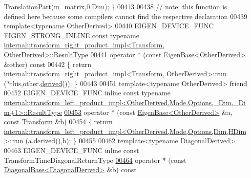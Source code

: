 \begin{DoxyCode}
      \hyperlink{group___core___module_class_eigen_1_1_block}{TranslationPart}(m\_matrix,0,Dim); \}
00413 
00438   \textcolor{comment}{// note: this function is defined here because some compilers cannot find the respective declaration}
00439   \textcolor{keyword}{template}<\textcolor{keyword}{typename} OtherDerived>
00440   EIGEN\_DEVICE\_FUNC EIGEN\_STRONG\_INLINE \textcolor{keyword}{const} \textcolor{keyword}{typename} 
      \hyperlink{struct_eigen_1_1internal_1_1transform__right__product__impl}{internal::transform\_right\_product\_impl<Transform, OtherDerived>::ResultType}
\hyperlink{group___geometry___module_a4e44db730819ead6e555cf325cea3fd6}{00441}   operator * (\textcolor{keyword}{const} \hyperlink{group___core___module_struct_eigen_1_1_eigen_base}{EigenBase<OtherDerived>} &other)\textcolor{keyword}{ const}
00442 \textcolor{keyword}{  }\{ \textcolor{keywordflow}{return} \hyperlink{struct_eigen_1_1internal_1_1transform__right__product__impl}{internal::transform\_right\_product\_impl<Transform, OtherDerived>::run}
      (*\textcolor{keyword}{this},other.\hyperlink{group___core___module_a324b16961a11d2ecfd2d1b7dd7946545}{derived}()); \}
00443 
00451   \textcolor{keyword}{template}<\textcolor{keyword}{typename} OtherDerived> \textcolor{keyword}{friend}
00452   EIGEN\_DEVICE\_FUNC \textcolor{keyword}{inline} \textcolor{keyword}{const} \textcolor{keyword}{typename} 
      \hyperlink{struct_eigen_1_1internal_1_1transform__left__product__impl}{internal::transform\_left\_product\_impl<OtherDerived,Mode,Options,\_Dim,\_Dim+1>::ResultType}
\hyperlink{group___geometry___module_ab87ba80761e1f32166253856b7a360e8}{00453}     operator * (\textcolor{keyword}{const} \hyperlink{group___core___module_struct_eigen_1_1_eigen_base}{EigenBase<OtherDerived>} &a, \textcolor{keyword}{const} 
      \hyperlink{group___geometry___module_class_eigen_1_1_transform}{Transform} &b)
00454   \{ \textcolor{keywordflow}{return} 
      \hyperlink{struct_eigen_1_1internal_1_1transform__left__product__impl}{internal::transform\_left\_product\_impl<OtherDerived,Mode,Options,Dim,HDim>::run}
      (a.\hyperlink{group___core___module_a324b16961a11d2ecfd2d1b7dd7946545}{derived}(),b); \}
00455 
00462   \textcolor{keyword}{template}<\textcolor{keyword}{typename} DiagonalDerived>
00463   EIGEN\_DEVICE\_FUNC \textcolor{keyword}{inline} \textcolor{keyword}{const} TransformTimeDiagonalReturnType
\hyperlink{group___geometry___module_a4f566a9fef984636431d6d5ebea0ba67}{00464}     operator * (\textcolor{keyword}{const} \hyperlink{class_eigen_1_1_diagonal_base}{DiagonalBase<DiagonalDerived>} &b)\textcolor{keyword}{ const}

\end{DoxyCode}
